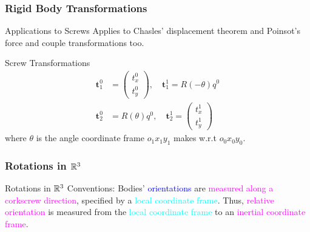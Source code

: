 \begin{frame}
	\frametitle{Rigid Body Transformations}
	\begin{block}{Applications to Screws}
		Applies to Chasles' displacement theorem and Poinsot's force and couple transformations too.
	\end{block}
	\begin{block}{Screw Transformations}
		\begin{align}
			\bm{t}^0_1 &= \left( \begin{array}{c}
				t^0_x \\  t^0_y %
			\end{array}
			\right),
			\quad \bm{t}^1_1 = R(-\theta) q^0 \\
		    \bm{t}^0_2 &= R(\theta) q^0, \quad \bm{t}^1_2 = \left( \begin{array}{c}
				t^1_x \\  t^1_y %
			\end{array}
			\right)
		\end{align}
		where $\theta$ is the angle coordinate frame $o_1 x_1 y_1$ makes w.r.t $o_0 x_0 y_0$.
	\end{block}
\end{frame}

\begin{frame}
	\frametitle{Rotations in $\mathbb{R}^3$}
	\begin{block}{Rotations in $\mathbb{R}^3$}
		Conventions: Bodies' \textcolor{blue}{orientations} are \textcolor{magenta}{measured along a corkscrew direction}, specified by a \textcolor{cyan}{local coordinate frame}. Thus, \textcolor{magenta}{relative orientation} is measured from the \textcolor{cyan}{local coordinate frame} to an \textcolor{magenta}{inertial coordinate frame}.
	\end{block}
\end{frame}

